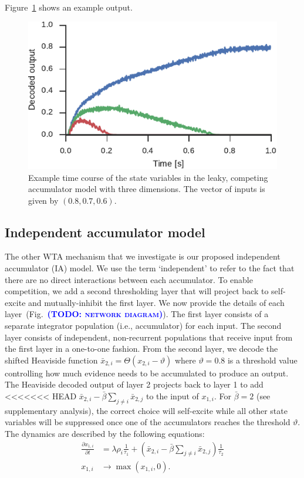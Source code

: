 \documentclass[10pt,letterpaper]{article}
\makeatletter
\newcommand{\todo}[1]{\textbf{\textsc{\textcolor{blue}{(TODO\@: #1)}}}}
\makeatother
\begin{document}
Figure~\ref{fig:usher-mcclelland} shows an example output.
\begin{figure}
    \centering
    \includegraphics{figures/usher-mcclelland}
    \caption{Example time course of the state variables in the leaky, competing 
        accumulator model with three dimensions. The vector of inputs is given 
        by $(0.8, 0.7, 0.6)$.}\label{fig:usher-mcclelland}
\end{figure}

\subsection{Independent accumulator model}
The other WTA mechanism that we investigate is our proposed independent accumulator (IA) model.
We use the term `independent' to refer to the fact that there are no direct interactions between each accumulator.
To enable competition, we add a second thresholding layer that will project back to self-excite and mutually-inhibit the first layer.
We now provide the details of each layer~(Fig.~\todo{network diagram}).
The first layer consists of a separate integrator population (i.e., accumulator) for each input.
The second layer consists of independent, non-recurrent populations that receive input from the first layer in a one-to-one fashion.
From the second layer, we decode the shifted Heaviside function $\bar{x}_{2,i} = \Theta(x_{2,i} - \vartheta)$ where $\vartheta = 0.8$ is a threshold value controlling how much evidence needs to be accumulated to produce an output.
The Heaviside decoded output of layer 2 projects back to layer 1 to add <<<<<<< HEAD
$\bar{x}_{2,i} - \bar{\beta} \sum_{j \neq i} \bar{x}_{2,j}$ to the input of $x_{1,i}$.
For $\bar{\beta} = 2$ (see supplementary analysis), the correct choice will self-excite while all other state variables will be suppressed once one of the accumulators reaches the threshold $\vartheta$.
The dynamics are described by the following equations:
\begin{equation}
    \begin{split}
        \frac{{\partial x}_{1,i}}{\partial t} &= \lambda \rho_i \frac{1}{\tau_1} + \left( 
            \bar{x}_{2,i} - \bar{\beta} \sum_{j \neq i} \bar{x}_{2,j} \right) \frac{1}{\tau_2} \\
        x_{1,i} &\rightarrow \max(x_{1,i}, 0) .
    \end{split}
\end{equation}
\end{document}
